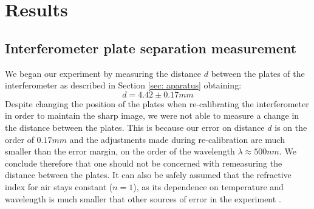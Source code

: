 \documentclass[11pt]{article}
\begin{document}
\section{Results} \label{sec: results}
\subsection{Interferometer plate separation measurement} 
\label{sec: d}
We began our experiment by measuring the distance $d$ between the plates of the interferometer as described in Section \ref{sec: aparatus} obtaining: 
\begin{equation}
    d = 4.42 \pm 0.17 \si{mm} \label{res: d value}
\end{equation}
Despite changing the position of the plates when re-calibrating the interferometer in order to maintain the sharp image, we were not able to measure a change in the distance between the plates. This is because our error on distance $d$ is on the order of $0.17 \si{mm}$ and the adjustments made during re-calibration are much smaller than the error margin, on the order of the wavelength $\lambda \approx 500 \si{nm}$. We conclude therefore that one should not be concerned with remeasuring the distance between the plates. It can also be safely assumed that the refractive index for air stays constant ($n=1$), as its dependence on temperature and wavelength is much smaller that other sources of error in the experiment \cite{Polyanskiy2024}. 
\end{document}
